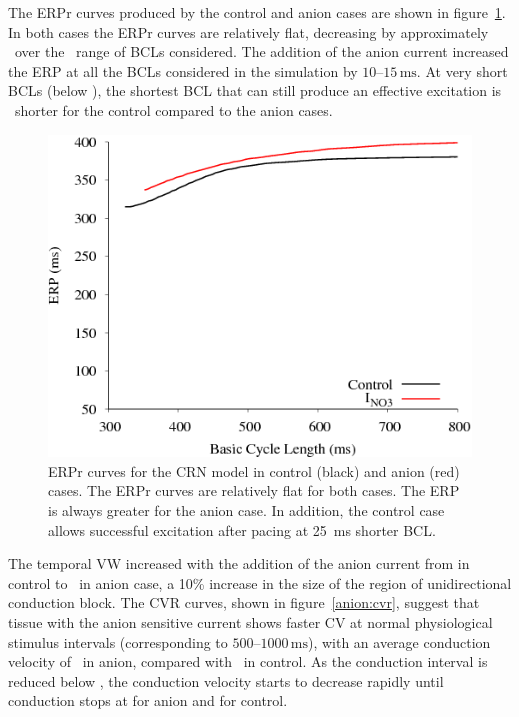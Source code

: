 The ERPr curves produced by the control and anion cases are shown in
figure~\ref{anion:erpr}.  In both cases the ERPr curves are relatively flat,
decreasing by approximately \ over the \ range of BCLs considered.  The
addition of the anion current increased the ERP at all the BCLs considered in
the simulation by $10\text{--}15\,\text{ms}$.  At very short BCLs (below ), the shortest BCL
that can still produce an effective excitation is \ shorter for the control
compared to the anion cases.

\begin{figure}
\includegraphics{figures/toolkit/anion/04_ERPR}
\caption[Anion Sensitive Effective Refractory Period Restitution]{
\label{anion:erpr} ERPr curves for the CRN model in control (black) and anion
(red) cases.  The ERPr curves are relatively flat for both cases.  The ERP is
always greater for the anion case.  In addition, the control case allows
successful excitation after pacing at 25~ms shorter BCL.}
\end{figure}

The temporal VW increased with the addition of the anion current from
 in
control to \ in anion case, a 10\% increase in the size of the region of
unidirectional conduction block.  The CVR curves, shown in
figure~\ref{anion:cvr}, suggest that tissue with the anion sensitive current
shows faster CV at normal physiological stimulus intervals (corresponding to
$500\text{--}1000\,\text{ms}$), with an average conduction velocity of
\ in anion, compared with \ in control.  As the conduction
interval is reduced below , the conduction velocity starts to decrease
rapidly until conduction stops at  for anion and  for control.


